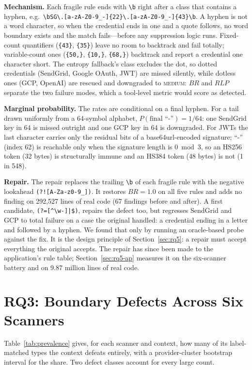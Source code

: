 \documentclass[10pt,journal,compsoc]{IEEEtran}
\begin{document}
\textbf{Mechanism.} Each fragile rule ends with \verb|\b| right after a class that contains a hyphen, e.g.\ \lstinline!\bSG\.[a-zA-Z0-9_-]{22}\.[a-zA-Z0-9_-]{43}\b!. A hyphen is not a word character, so when the credential ends in one and a quote follows, no word boundary exists and the match fails---before any suppression logic runs. Fixed-count quantifiers (\texttt{\{43\}}, \texttt{\{35\}}) leave no room to backtrack and fail totally; variable-count ones (\texttt{\{50,\}}, \texttt{\{10,\}}, \texttt{\{68,\}}) backtrack and report a credential one character short. The entropy fallback's class excludes the dot, so dotted credentials (SendGrid, Google OAuth, JWT) are missed silently, while dotless ones (GCP, OpenAI) are rescued and downgraded to \textsc{medium}: $BR$ and $RLP$ separate the two failure modes, which a tool-level metric would score as detected.

\textbf{Marginal probability.} The rates are conditional on a final hyphen. For a tail drawn uniformly from a 64-symbol alphabet, $P(\text{final ``-''})=1/64$: one SendGrid key in 64 is missed outright and one GCP key in 64 is downgraded. For JWTs the last character carries only the residual bits of a base64url-encoded signature; ``-'' (index 62) is reachable only when the signature length is $0\bmod 3$, so an HS256 token (32 bytes) is structurally immune and an HS384 token (48 bytes) is not (1 in 548).

\textbf{Repair.} The repair replaces the trailing \verb|\b| of each fragile rule with the negative lookahead \verb+(?![A-Za-z0-9_])+. It restores $BR=1.0$ on all five rules and adds no finding on 292{,}527 lines of real code (67 findings before and after). A first candidate, \verb+(?=[^\w-]|$)+, repairs the defect too, but regresses SendGrid and GCP to total failure on a case the original handled: a credential ending in a letter and followed by a hyphen. We found that only by running an oracle-based probe against the fix. It is the design principle of Section~\ref{sec:rq5}: a repair must accept everything the original accepts. The repair has since been made to the application's rule table; Section~\ref{sec:rq5-ap} measures it on the six-scanner battery and on 9.87 million lines of real code.

\section{RQ3: Boundary Defects Across Six Scanners}
\label{sec:rq3}

Table~\ref{tab:prevalence} gives, for each scanner and context, how many of its label-matched types the context defeats entirely, with a provider-cluster bootstrap interval for the share. Two defect classes account for every large count.
\end{document}
